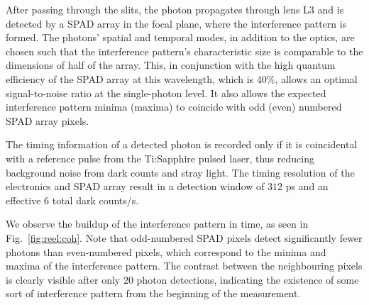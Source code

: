 \documentclass[prl,reprint,twocolumn,amsmath,preprintnumbers,amssymb,superscriptaddress]{revtex4-1}
\newcommand{\figref}[1]{Fig.~\ref{#1}}
\begin{document}
After passing through the slits, the photon propagates through lens L3 and is detected by a SPAD array in the focal plane, where the interference pattern is formed. The photons' spatial and temporal modes, in addition to the optics, are chosen such that the interference pattern's characteristic size is comparable to the dimensions of half of the array. This, in conjunction with the high quantum efficiency of the SPAD array at this wavelength, which is $40\%$, allows an optimal signal-to-noise ratio at the single-photon level. It also allows the expected interference pattern minima (maxima) to coincide with odd (even) numbered SPAD array pixels.

The timing information of a detected photon is recorded only if it is coincidental with a reference pulse from the Ti:Sapphire pulsed laser, thus reducing background noise from dark counts and stray light. The timing resolution of the electronics and SPAD array result in a detection window of $312$ ps and an effective $6$ total dark counts/s.

We observe the buildup of the interference pattern in time, as seen in \figref{fig:reel:coh}. Note that odd-numbered SPAD pixels detect significantly fewer photons than even-numbered pixels, which correspond to the minima and maxima of the interference pattern. The contrast between the neighbouring pixels is clearly visible after only $20$ photon detections, indicating the existence of some sort of interference pattern from the beginning of the measurement.
\end{document}

